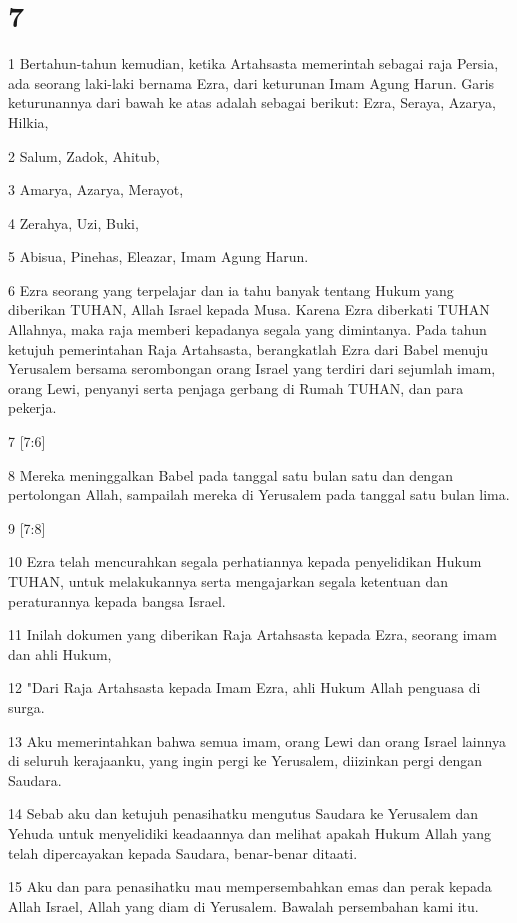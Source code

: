 \chapter{7}

\par 1 Bertahun-tahun kemudian, ketika Artahsasta memerintah sebagai raja Persia, ada seorang laki-laki bernama Ezra, dari keturunan Imam Agung Harun. Garis keturunannya dari bawah ke atas adalah sebagai berikut: Ezra, Seraya, Azarya, Hilkia,
\par 2 Salum, Zadok, Ahitub,
\par 3 Amarya, Azarya, Merayot,
\par 4 Zerahya, Uzi, Buki,
\par 5 Abisua, Pinehas, Eleazar, Imam Agung Harun.
\par 6 Ezra seorang yang terpelajar dan ia tahu banyak tentang Hukum yang diberikan TUHAN, Allah Israel kepada Musa. Karena Ezra diberkati TUHAN Allahnya, maka raja memberi kepadanya segala yang dimintanya. Pada tahun ketujuh pemerintahan Raja Artahsasta, berangkatlah Ezra dari Babel menuju Yerusalem bersama serombongan orang Israel yang terdiri dari sejumlah imam, orang Lewi, penyanyi serta penjaga gerbang di Rumah TUHAN, dan para pekerja.
\par 7 [7:6]
\par 8 Mereka meninggalkan Babel pada tanggal satu bulan satu dan dengan pertolongan Allah, sampailah mereka di Yerusalem pada tanggal satu bulan lima.
\par 9 [7:8]
\par 10 Ezra telah mencurahkan segala perhatiannya kepada penyelidikan Hukum TUHAN, untuk melakukannya serta mengajarkan segala ketentuan dan peraturannya kepada bangsa Israel.
\par 11 Inilah dokumen yang diberikan Raja Artahsasta kepada Ezra, seorang imam dan ahli Hukum,
\par 12 "Dari Raja Artahsasta kepada Imam Ezra, ahli Hukum Allah penguasa di surga.
\par 13 Aku memerintahkan bahwa semua imam, orang Lewi dan orang Israel lainnya di seluruh kerajaanku, yang ingin pergi ke Yerusalem, diizinkan pergi dengan Saudara.
\par 14 Sebab aku dan ketujuh penasihatku mengutus Saudara ke Yerusalem dan Yehuda untuk menyelidiki keadaannya dan melihat apakah Hukum Allah yang telah dipercayakan kepada Saudara, benar-benar ditaati.
\par 15 Aku dan para penasihatku mau mempersembahkan emas dan perak kepada Allah Israel, Allah yang diam di Yerusalem. Bawalah persembahan kami itu.

